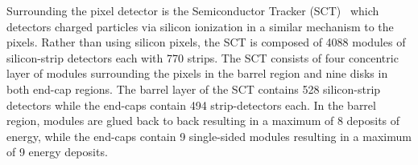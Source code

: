 

Surrounding the pixel detector is the Semiconductor Tracker (SCT)~\cite{atlas_sct} which detectors charged particles via silicon ionization in a similar mechanism to the pixels. Rather than using silicon pixels, the SCT is composed of 4088 modules of silicon-strip detectors each with 770 strips. The SCT consists of four concentric layer of modules surrounding the pixels in the barrel region and nine disks in both end-cap regions. The barrel layer of the SCT contains 528 silicon-strip detectors while the end-caps contain 494 strip-detectors each. In the barrel region, modules are glued back to back resulting in a maximum of 8 deposits of energy, while the end-caps contain 9 single-sided modules resulting in a maximum of 9 energy deposits. 